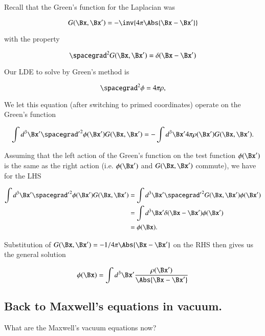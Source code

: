 Recall that the Green's function for the Laplacian was 

\begin{equation}\label{eqn:relativisticElectrodynamicsL14:292}
G(\Bx, \Bx') = -\inv{4 \pi \Abs{\Bx - \Bx'}}
\end{equation}

with the property 

\begin{equation}\label{eqn:relativisticElectrodynamicsL14:294}
\spacegrad^2 G(\Bx, \Bx') = \delta(\Bx - \Bx')
\end{equation}

Our LDE to solve by Green's method is

\begin{equation}\label{eqn:relativisticElectrodynamicsL14:296}
\spacegrad^2 \phi = 4 \pi \rho,
\end{equation}

We let this equation (after switching to primed coordinates) operate on the Green's function

\begin{equation}\label{eqn:relativisticElectrodynamicsL14:298}
\int d^3 \Bx' {\spacegrad'}^2 \phi(\Bx') G(\Bx, \Bx') 
=
-\int d^3 \Bx' 4 \pi \rho(\Bx') G(\Bx, \Bx').
\end{equation}

Assuming that the left action of the Green's function on the test function $\phi(\Bx')$ is the same as the right action (i.e. $\phi(\Bx')$ and $G(\Bx, \Bx')$ commute), we have for the LHS

\begin{align*}
\int d^3 \Bx' {\spacegrad'}^2 \phi(\Bx') G(\Bx, \Bx') 
&=
\int d^3 \Bx' {\spacegrad'}^2 G(\Bx, \Bx') \phi(\Bx') \\
&=
\int d^3 \Bx' \delta(\Bx - \Bx') \phi(\Bx') \\
&=
\phi(\Bx).
\end{align*}

Substitution of $G(\Bx, \Bx') = -1/4 \pi \Abs{\Bx - \Bx'}$ on the RHS then gives us the general solution

\begin{equation}\label{eqn:relativisticElectrodynamicsL14:300}
\phi(\Bx) = \int d^3 \Bx' \frac{\rho(\Bx') }{\Abs{\Bx - \Bx'}}
\end{equation}

\subsection{Back to Maxwell's equations in vacuum.}
What are the Maxwell's vacuum equations now?

